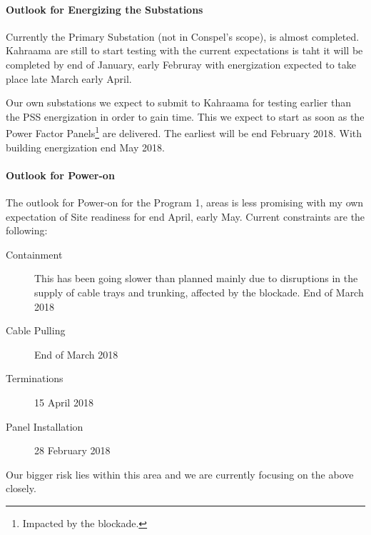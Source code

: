 \paragraph{Outlook for Energizing the Substations}

Currently the Primary Substation (not in Conspel's scope), is almost completed. Kahraama are still to start testing with the current expectations is taht it will be completed by end of January, early Februray with energization expected to take place late March early April.

Our own substations we expect to submit to Kahraama for testing earlier than the PSS energization in order to gain time. This we expect to start as soon as the Power Factor Panels\footnote{Impacted by the blockade.} are delivered. The earliest will be end February 2018. With building energization end May 2018. 


\paragraph{Outlook for Power-on}

The outlook for Power-on for the Program 1, areas is less promising with my own expectation of Site readiness for end April, early May. Current constraints are the following:

\begin{description}
\item [Containment]  This has been going slower than planned mainly due to disruptions in the supply of cable trays and trunking, affected by the blockade. End of March 2018
\item [Cable Pulling] End of March 2018
\item [Terminations]  15 April 2018
\item [Panel Installation]  28 February 2018
\end{description}

Our bigger risk lies within this area and we are currently focusing on the above closely.








